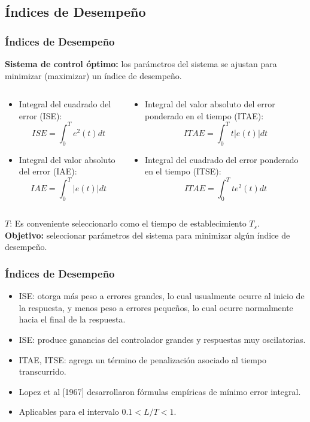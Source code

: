 \documentclass[aspectratio=169,handout]{beamer}
\theoremstyle{definition}
\theoremstyle{plain}
\theoremstyle{remark}
\begin{document}
\subsection{Índices de Desempeño}
\begin{frame}[<+->]\frametitle{Índices de Desempeño}
	\textbf{Sistema de control óptimo:} los parámetros del sistema se ajustan para minimizar (maximizar) un índice de desempeño.
	\begin{columns}
	\begin{column}{0.5\textwidth}
	\begin{itemize}
		\item Integral del cuadrado del error (ISE):
		\begin{equation*}
			ISE = \int_0^T e^2(t) dt
		\end{equation*}
		\item Integral del valor absoluto del error (IAE):
		\begin{equation*}
			IAE = \int_0^T |e(t)| dt
		\end{equation*}
	\end{itemize}
	\end{column}	
	\begin{column}{0.5\textwidth}
	\begin{itemize}
		\item Integral del valor absoluto del error ponderado en el tiempo (ITAE):
		\begin{equation*}
			ITAE = \int_0^T t |e(t)| dt
		\end{equation*}
		\item Integral del cuadrado del error ponderado en el tiempo (ITSE):
		\begin{equation*}
			ITAE = \int_0^T t e^2(t) dt
		\end{equation*}
	\end{itemize}
	\end{column}	
	\end{columns}
	\vspace*{-5mm}
	\pause
	$T$: Es conveniente seleccionarlo como el tiempo de establecimiento $T_s$.\\
	\pause
	\textbf{Objetivo:} seleccionar parámetros del sistema para minimizar algún índice de desempeño.
\end{frame}

\begin{frame}[<+->]\frametitle{Índices de Desempeño}
	\begin{itemize}
		\item ISE: otorga más peso a errores grandes, lo cual usualmente ocurre al inicio de la respuesta, y menos peso a errores pequeños, lo cual ocurre normalmente hacia el final de la respuesta.
		\item ISE: produce ganancias del controlador grandes y respuestas muy oscilatorias.
		\item ITAE, ITSE: agrega un término de penalización asociado al tiempo transcurrido.
		\item Lopez et al [1967] desarrollaron fórmulas empíricas de mínimo error integral.
		\item Aplicables para el intervalo $0.1 < L/T < 1$.
	\end{itemize}
\end{frame}
\end{document}

